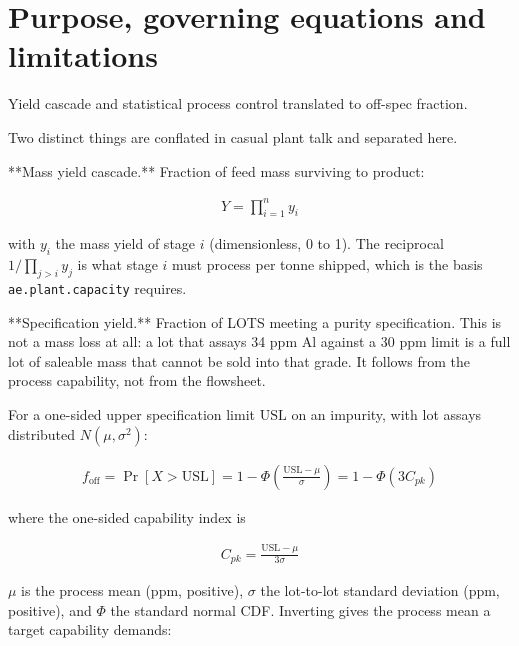 \documentclass[10pt,a4paper,twoside]{report}
\begin{document}
\section{Purpose, governing equations and limitations}

Yield cascade and statistical process control translated to off-spec fraction.

Two distinct things are conflated in casual plant talk and separated here.

**Mass yield cascade.** Fraction of feed mass surviving to product:

\begin{equation*}
\begin{gathered}
Y = \prod_{i=1}^{n} y_i
\end{gathered}
\end{equation*}

with $y_i$ the mass yield of stage $i$ (dimensionless, 0 to 1). The reciprocal $1/\prod_{j>i} y_j$ is what stage $i$ must process per tonne shipped, which is the basis \texttt{ae.plant.capacity} requires.

**Specification yield.** Fraction of LOTS meeting a purity specification. This is not a mass loss at all: a lot that assays 34 ppm Al against a 30 ppm limit is a full lot of saleable mass that cannot be sold into that grade. It follows from the process capability, not from the flowsheet.

For a one-sided upper specification limit $\mathrm{USL}$ on an impurity, with lot assays distributed $N(\mu, \sigma^2)$:

\begin{equation*}
\begin{gathered}
f_{\mathrm{off}} = \Pr[X > \mathrm{USL}] = 1 - \Phi\!\left(\frac{\mathrm{USL} - \mu}{\sigma}\right) = 1 - \Phi\!\left(3 C_{pk}\right)
\end{gathered}
\end{equation*}

where the one-sided capability index is

\begin{equation*}
\begin{gathered}
C_{pk} = \frac{\mathrm{USL} - \mu}{3\sigma}
\end{gathered}
\end{equation*}

$\mu$ is the process mean (ppm, positive), $\sigma$ the lot-to-lot standard deviation (ppm, positive), and $\Phi$ the standard normal CDF. Inverting gives the process mean a target capability demands:
\end{document}
